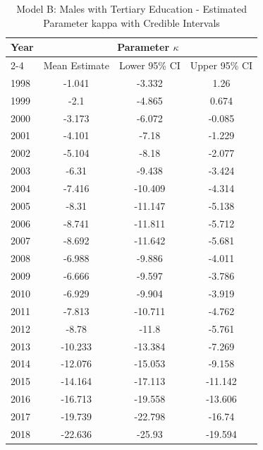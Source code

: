 \begin{landscape}
\begin{table}[htbp]
\centering
\caption{Model B: Males with Tertiary Education - Estimated Parameter kappa  with Credible Intervals}
\label{tab:parameters_k16}
\begin{tabular}{@{}lccc@{}}
\toprule
Year & \multicolumn{3}{c}{Parameter \(\kappa\)} \\
\cmidrule(lr){2-4}
      & Mean Estimate & Lower 95\% CI & Upper 95\% CI \\
\midrule
1998 & -1.041 & -3.332 & 1.26 \\
1999 & -2.1 & -4.865 & 0.674 \\
2000 & -3.173 & -6.072 & -0.085 \\
2001 & -4.101 & -7.18 & -1.229 \\
2002 & -5.104 & -8.18 & -2.077 \\
2003 & -6.31 & -9.438 & -3.424 \\
2004 & -7.416 & -10.409 & -4.314 \\
2005 & -8.31 & -11.147 & -5.138 \\
2006 & -8.741 & -11.811 & -5.712 \\
2007 & -8.692 & -11.642 & -5.681 \\
2008 & -6.988 & -9.886 & -4.011 \\
2009 & -6.666 & -9.597 & -3.786 \\
2010 & -6.929 & -9.904 & -3.919 \\
2011 & -7.813 & -10.711 & -4.762 \\
2012 & -8.78 & -11.8 & -5.761 \\
2013 & -10.233 & -13.384 & -7.269 \\
2014 & -12.076 & -15.053 & -9.158 \\
2015 & -14.164 & -17.113 & -11.142 \\
2016 & -16.713 & -19.558 & -13.606 \\
2017 & -19.739 & -22.798 & -16.74 \\
2018 & -22.636 & -25.93 & -19.594 \\
\bottomrule
\end{tabular}
\end{table}
\end{landscape}